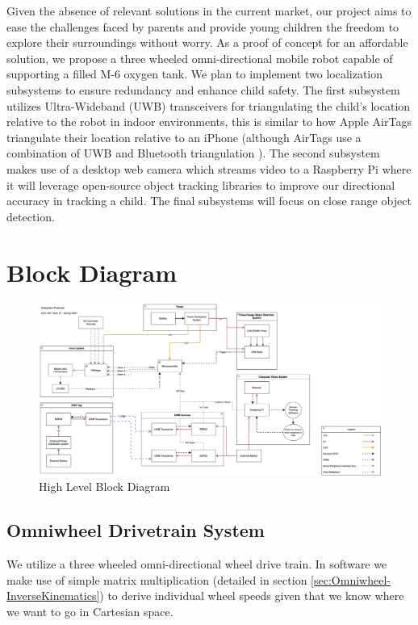 \documentclass{report}
\begin{document}
    Given the absence of relevant solutions in the current market, our project aims to ease the challenges faced by parents and provide young children the freedom to explore their surroundings without worry. As a proof of concept for an affordable solution, we propose a three wheeled omni-directional mobile robot capable of supporting a filled M-6 oxygen tank. We plan to implement two localization subsystems to ensure redundancy and enhance child safety. The first subsystem utilizes Ultra-Wideband (UWB) transceivers for triangulating the child's location relative to the robot in indoor environments, this is similar to how Apple AirTags triangulate their location relative to an iPhone \cite{airtag_uwb} (although AirTags use a combination of UWB and Bluetooth triangulation \cite{airtag_ble}). The second subsystem makes use of a desktop web camera which streams video to a Raspberry Pi where it will leverage open-source object tracking libraries to improve our directional accuracy in tracking a child. The final subsystems will focus on close range object detection.

    \newpage

    \section{Block Diagram}
    \begin{figure}[ht!]
      \centering
      \includegraphics[width=1.2\textwidth]{Images/BlockDiagram.png}
      \caption{High Level Block Diagram}
      \label{fig:BlockDiagram}
  \end{figure}

    \subsection{Omniwheel Drivetrain System}
    We utilize a three wheeled omni-directional wheel drive train. In software we make use of simple matrix multiplication (detailed in section \ref{sec:Omniwheel-InverseKinematics}) to derive individual wheel speeds given that we know where we want to go in Cartesian space.
\end{document}

